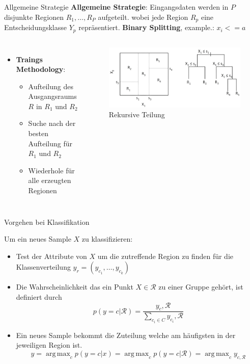 \documentclass{beamer}
\DeclareMathOperator*{\argmax}{arg\,max}
\begin{document}
\begin{frame}{Allgemeine Strategie}
	\textbf{Allgemeine Strategie}: Eingangsdaten werden in $P$ disjunkte Regionen $R_1,\dots,R_P$ aufgeteilt. 
	wobei jede Region $R_p$ eine Entscheidungsklasse $Y_p$ repräsentiert. 
 \textbf{Binary Splitting}, example.: $x_i <= a$
	
	\begin{columns}
 			\begin{itemize}
				\item{\textbf{Traings Methodology}:}
				\begin{itemize}
					\item {Aufteilung des Ausgangsraums $R$ in $R_1$ und $R_2$}
					\item{Suche nach der besten Aufteilung für $R_1$ und $R_2$}
					\item{Wiederhole für alle erzeugten Regionen}
				\end{itemize}
			\end{itemize}
			
			\begin{figure}
				\includegraphics[width=\linewidth]{Images/split.png}
				\caption{Rekursive Teilung \cite{hastie_tibshirani_friedman}}
			\end{figure}
	\end{columns}
\end{frame}



\begin{frame}{Vorgehen bei Klassifikation}

Um ein neues Sample $X$ zu klassifizieren:
	\begin{itemize}
		\item Test der Attribute von $X$ um die zutreffende Region zu finden für die Klassenverteilung $y_r = (y_{c_1}, \ldots, y_{c_k})$
		\item Die Wahrscheinlichkeit das ein Punkt $X \in \mathcal{R}$ zu einer Gruppe gehört, ist definiert durch
			\[p(y = c | \mathcal{R}) = \frac{y_c, \mathcal{R}}{\sum_{c_i \in C} y_{c_i}, \mathcal{R}}\]
		\item Ein neues Sample bekommt die Zuteilung welche am häufigsten in der jeweiligen Region ist.
			\[\hat{y} = \argmax_c p(y = c | x) = \argmax_c p(y = c | \mathcal{R}) = \argmax_c y_{c,\mathcal{R}}\]
	\end{itemize}
\end{frame}
\end{document}
